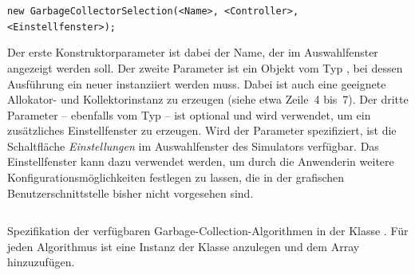 \vspace*{-0.5cm}
\begin{center}
	\texttt{new GarbageCollectorSelection(<Name>, <Controller>, <Einstellfenster>);}
\end{center}

\vspace*{-0.5cm}
Der erste Konstruktorparameter ist dabei der Name, der im Auswahlfenster angezeigt werden soll.
Der zweite Parameter ist ein Objekt vom Typ , bei dessen Ausführung ein neuer  instanziiert werden muss.
Dabei ist auch eine geeignete Allokator- und Kollektorinstanz zu erzeugen (siehe etwa Zeile~4 bis~7).
Der dritte Parameter -- ebenfalls vom Typ  -- ist optional und wird verwendet, um ein zusätzliches Einstellfenster zu erzeugen.
Wird der Parameter spezifiziert, ist die Schaltfläche \textit{Einstellungen} im Auswahlfenster des Simulators verfügbar.
Das Einstellfenster kann dazu verwendet werden, um durch die Anwenderin weitere Konfigurationsmöglichkeiten festlegen zu lassen, die in der grafischen Benutzerschnittstelle bisher nicht vorgesehen sind.

\begin{listing}[h]
	\inputminted[]{java}{code/CollectorSelection.java}
	\caption[Spezifikation der verfügbaren Algorithmen]{Spezifikation der verfügbaren Garbage-Collection-Algorithmen in der Klasse . Für jeden Algorithmus ist eine Instanz der Klasse  anzulegen und dem Array  hinzuzufügen.}
	\label{java:selection}
\end{listing}